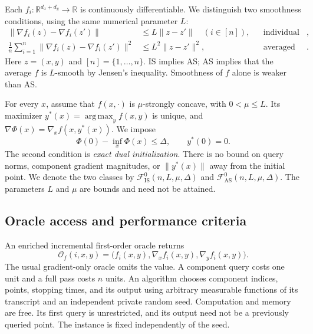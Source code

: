 \documentclass[11pt,letterpaper]{article}
\theoremstyle{definition}
\theoremstyle{remark}
\newcommand{\R}{\mathbb R}
\newcommand{\cF}{\mathcal F}
\DeclareMathOperator*{\argmax}{arg\,max}
\begin{document}
Each $f_i:\R^{d_x+d_y}\to\R$ is continuously differentiable. We distinguish
two smoothness conditions, using the same numerical parameter $L$:
\begin{align}
 \|\nabla f_i(z)-\nabla f_i(z')\|
 &\le L\|z-z'\| \quad (i\in[n]),
 &&\text{individual smoothness (IS)},\label{eq:IS}\\
 \frac1n\sum_{i=1}^n\|\nabla f_i(z)-\nabla f_i(z')\|^2
 &\le L^2\|z-z'\|^2,
 &&\text{averaged smoothness (AS)}.\label{eq:AS}
\end{align}
Here $z=(x,y)$ and $[n]=\{1,\ldots,n\}$. IS implies AS; AS implies that
the average $f$ is $L$-smooth by Jensen's inequality. Smoothness of $f$
alone is weaker than AS.

For every $x$, assume that $f(x,\cdot)$ is $\mu$-strongly concave, with
$0<\mu\le L$. Its maximizer
$y^*(x)=\argmax_y f(x,y)$ is unique, and
$\nabla\Phi(x)=\nabla_x f(x,y^*(x))$. We impose
\begin{equation}
 \Phi(0)-\inf_x\Phi(x)\le\Delta,
 \qquad y^*(0)=0.
 \label{eq:initialization}
\end{equation}
The second condition is \emph{exact dual initialization}. There is no bound
on query norms, component gradient magnitudes, or $\|y^*(x)\|$ away from the
initial point. We denote the two classes by
$\cF^0_{\mathrm{IS}}(n,L,\mu,\Delta)$ and
$\cF^0_{\mathrm{AS}}(n,L,\mu,\Delta)$. The parameters $L$ and $\mu$ are
bounds and need not be attained.

\subsection{Oracle access and performance criteria}

An enriched incremental first-order oracle returns
\begin{equation}
 \mathcal O_f(i,x,y)
 =\bigl(f_i(x,y),\nabla_x f_i(x,y),\nabla_y f_i(x,y)\bigr).
 \label{eq:oracle}
\end{equation}
The usual gradient-only oracle omits the value. A component query costs one
unit and a full pass costs $n$ units. An algorithm chooses component indices,
points, stopping times, and its output using arbitrary measurable functions
of its transcript and an independent private random seed. Computation and
memory are free. Its first query is unrestricted, and its output need not be
a previously queried point. The instance is fixed independently of the seed.
\end{document}

